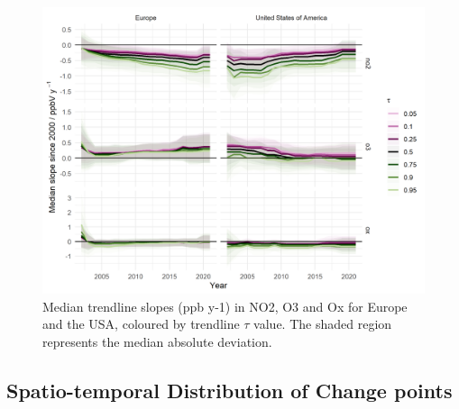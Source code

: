 \documentclass[journal abbreviation, manuscript]{copernicus}
\begin{document}
\begin{figure}[t]
\includegraphics[width=12cm]{plots/fixed_median_slopes_per_tau_continent_name.png}
\caption{Median trendline slopes (ppb y-1) in NO2, O3 and Ox for Europe and the USA, coloured by trendline $\tau$ value. The shaded region represents the median absolute deviation.}
\label{median_slopes_per_tau_cont_name_trends}
\end{figure}

\clearpage

\subsection{Spatio-temporal Distribution of Change points}
\end{document}
